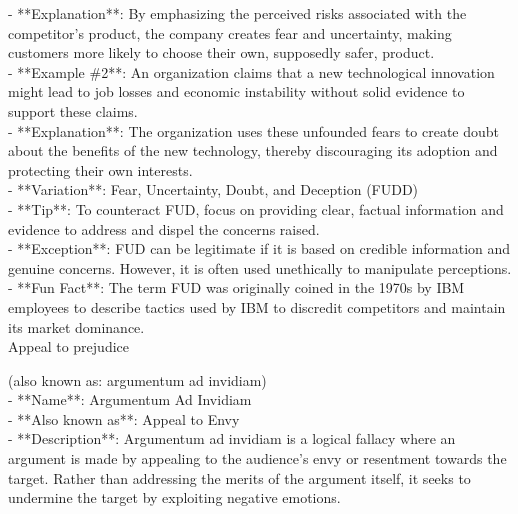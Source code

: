 \documentclass[a4paper,12pt,single,pdftex]{scrartcl}
\begin{document}
    
      - **Explanation**: By emphasizing the perceived risks associated with the competitor’s product, the company creates fear and uncertainty, making customers more likely to choose their own, supposedly safer, product.
    \\

    
      - **Example \#2**: An organization claims that a new technological innovation might lead to job losses and economic instability without solid evidence to support these claims.
    \\

    
      - **Explanation**: The organization uses these unfounded fears to create doubt about the benefits of the new technology, thereby discouraging its adoption and protecting their own interests.
    \\

    
      - **Variation**: Fear, Uncertainty, Doubt, and Deception (FUDD)
    \\

    
      - **Tip**: To counteract FUD, focus on providing clear, factual information and evidence to address and dispel the concerns raised.
    \\

    
      - **Exception**: FUD can be legitimate if it is based on credible information and genuine concerns. However, it is often used unethically to manipulate perceptions.
    \\

    
      - **Fun Fact**: The term FUD was originally coined in the 1970s by IBM employees to describe tactics used by IBM to discredit competitors and maintain its market dominance.
    \\

  

Appeal to prejudice
    
      (also known as: argumentum ad invidiam)
    \\

  
    
      - **Name**: Argumentum Ad Invidiam
    \\

    
      - **Also known as**: Appeal to Envy
    \\

    
      - **Description**: Argumentum ad invidiam is a logical fallacy where an argument is made by appealing to the audience's envy or resentment towards the target. Rather than addressing the merits of the argument itself, it seeks to undermine the target by exploiting negative emotions.
    \\
\end{document}
